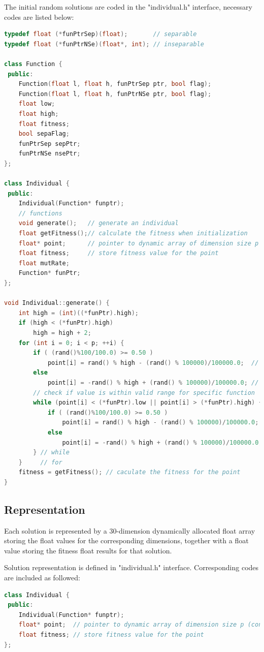 \documentclass[10pt,b5paper]{article}
\begin{document}
The initial random solutions are coded in the "individual.h" interface, necessary codes are listed below:
\begin{lstlisting}[language=c++]
typedef float (*funPtrSep)(float);       // separable
typedef float (*funPtrNSe)(float*, int); // inseparable

class Function {
 public:
    Function(float l, float h, funPtrSep ptr, bool flag);
    Function(float l, float h, funPtrNSe ptr, bool flag);
    float low;
    float high;
    float fitness;
    bool sepaFlag;
    funPtrSep sepPtr;
    funPtrNSe nsePtr;
};

class Individual {
 public:
    Individual(Function* funptr);                    
    // functions
    void generate();   // generate an individual
    float getFitness();// calculate the fitness when initialization
    float* point;      // pointer to dynamic array of dimension size p (constant)
    float fitness;     // store fitness value for the point
    float mutRate;
    Function* funPtr;
};

void Individual::generate() {           
    int high = (int)((*funPtr).high);
    if (high < (*funPtr).high)
        high = high + 2;
    for (int i = 0; i < p; ++i) {
        if ( (rand()%100/100.0) >= 0.50 )
            point[i] = rand() % high - (rand() % 100000)/100000.0;  // pos
        else
            point[i] = -rand() % high + (rand() % 100000)/100000.0; // neg
        // check if value is within valid range for specific function
        while (point[i] < (*funPtr).low || point[i] > (*funPtr).high) {
            if ( (rand()%100/100.0) >= 0.50 )
                point[i] = rand() % high - (rand() % 100000)/100000.0;
            else
                point[i] = -rand() % high + (rand() % 100000)/100000.0;
        } // while
    }     // for
    fitness = getFitness(); // caculate the fitness for the point
}
\end{lstlisting}
\subsection{Representation}
\label{sec-2-3}
Each solution is represented by a 30-dimension dynamically allocated float array storing the float values for the corresponding dimensions, together with a float value storing the fitness float results for that solution.

Solution representation is defined in "individual.h" interface. Corresponding codes are included as followed:
\begin{lstlisting}[language=c++]
class Individual {
 public:
    Individual(Function* funptr);                        
    float* point;  // pointer to dynamic array of dimension size p (constant)
    float fitness; // store fitness value for the point
};
\end{lstlisting}
\end{document}
